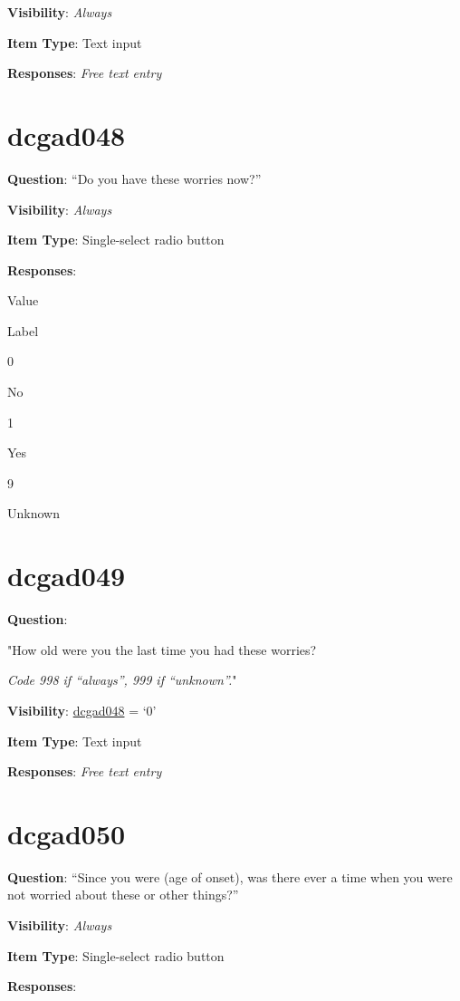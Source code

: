 \documentclass[]{book}
\begin{document}
\textbf{Visibility}: \emph{Always}

\textbf{Item Type}: Text input

\textbf{Responses}: \emph{Free text entry}

\hypertarget{dcgad048}{%
\section{dcgad048}\label{dcgad048}}

\textbf{Question}: ``Do you have these worries now?''

\textbf{Visibility}: \emph{Always}

\textbf{Item Type}: Single-select radio button

\textbf{Responses}:

Value

Label

0

No

1

Yes

9

Unknown

\hypertarget{dcgad049}{%
\section{dcgad049}\label{dcgad049}}

\textbf{Question}:

"How old were you the last time you had these worries?

\emph{Code 998 if ``always'', 999 if ``unknown''.}"

\textbf{Visibility}: \protect\hyperlink{dcgad048}{dcgad048} = `0'

\textbf{Item Type}: Text input

\textbf{Responses}: \emph{Free text entry}

\hypertarget{dcgad050}{%
\section{dcgad050}\label{dcgad050}}

\textbf{Question}: ``Since you were (age of onset), was there ever a time when you were not worried about these or other things?''

\textbf{Visibility}: \emph{Always}

\textbf{Item Type}: Single-select radio button

\textbf{Responses}:
\end{document}
